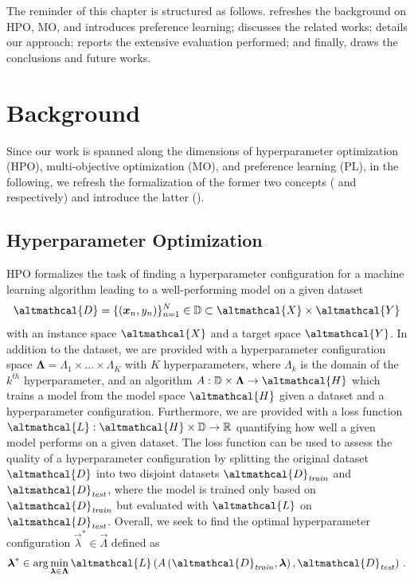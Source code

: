 The reminder of this chapter is structured as follows.
 refreshes the background on HPO, MO, and introduces preference learning;
 discusses the related works;
 details our approach;  reports the extensive evaluation performed; and finally,  draws the conclusions and future works.

\section{Background}
\label{moo-sec:background}

Since our work is spanned along the dimensions of hyperparameter optimization (HPO), multi-objective optimization (MO), and preference learning (PL), in the following, we refresh the formalization of the former two concepts ( and  respectively) and introduce the latter ().

\subsection{Hyperparameter Optimization} \label{moo-ssec:hpo}
HPO formalizes the task of finding a hyperparameter configuration for a machine learning algorithm leading to a well-performing model on a given dataset 
\begin{equation}
    \altmathcal{D} = \{(\vec{x}_n, y_n)\}_{n=1}^N \in \mathbb{D} \subset \altmathcal{X} \times \altmathcal{Y}
\end{equation}
with an instance space $\altmathcal{X}$ and a target space $\altmathcal{Y}$. 
In addition to the dataset, we are provided with a hyperparameter configuration space $\boldsymbol{\Lambda} = \Lambda_1 \times \dots \times \Lambda_K$ with $K$ hyperparameters, where $\Lambda_k$ is the domain of the $k^{\mathit{th}}$ hyperparameter, and an algorithm $A: \mathbb{D} \times \vec{\Lambda} \rightarrow \altmathcal{H}$ which trains a model from the model space $\altmathcal{H}$ given a dataset and a hyperparameter configuration. 
Furthermore, we are provided with a loss function $\altmathcal{L}: \altmathcal{H} \times \mathbb{D} \rightarrow \mathbb{R}$ quantifying how well a given model performs on a given dataset. 
The loss function can be used to assess the quality of a hyperparameter configuration by splitting the original dataset $\altmathcal{D}$ into two disjoint datasets $\altmathcal{D}_\mathit{train}$ and $\altmathcal{D}_\mathit{test}$, where the model is trained only based on $\altmathcal{D}_\mathit{train}$ but evaluated with $\altmathcal{L}$ on $\altmathcal{D}_\mathit{test}$. 
Overall, we seek to find the optimal hyperparameter configuration $\vec{\lambda}^* \in \vec{\Lambda}$ defined as 
\begin{equation}\label{moo-eq:hpo}
    \vec{\lambda}^* \in \arg\min_{\vec{\lambda} \in \vec{\Lambda}} \altmathcal{L}\left( A \left( \altmathcal{D}_{\mathit{train}}, \vec{\lambda} \right), \altmathcal{D}_\mathit{test} \right) \, .
\end{equation}

